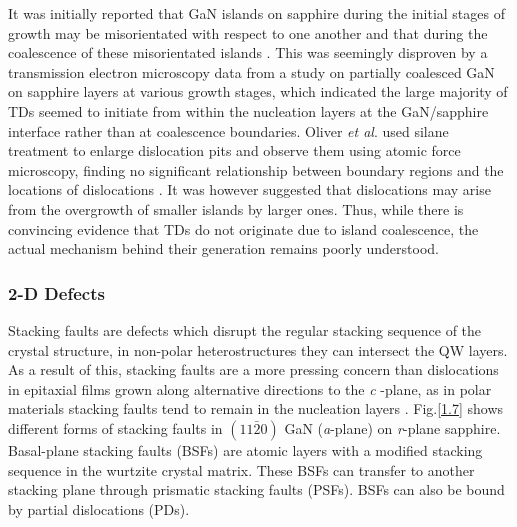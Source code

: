 It was initially reported that GaN islands on sapphire during the initial stages of growth may be misorientated with respect to one another and that during the coalescence of these misorientated islands \cite{Ning1996}. This was seemingly disproven by a transmission electron microscopy data from a study on partially coalesced GaN on sapphire layers at various growth stages, which indicated the large majority of TDs seemed to initiate from within the nucleation layers at the GaN/sapphire interface rather than at coalescence boundaries. Oliver {\it et al}. used silane treatment to enlarge dislocation pits and observe them using atomic force microscopy, finding no significant relationship between boundary regions and the locations of dislocations \cite{Oliver2008a}. It was however suggested that dislocations may arise from the overgrowth of smaller islands by larger ones. Thus, while there is convincing evidence that TDs do not originate due to island coalescence, the actual mechanism behind their generation remains poorly understood.

\subsubsection{2-D Defects}

Stacking faults are defects which disrupt the regular stacking sequence of the crystal structure, in non-polar heterostructures they can intersect the QW layers. As a result of this, stacking faults are a more pressing concern than dislocations in epitaxial films grown along alternative directions to the {\it c}
-plane, as in polar materials stacking faults tend to remain in the nucleation layers \cite{Scholz2012}. Fig.\ref{1.7} shows different forms of stacking faults in $(11\bar{2}0)$ GaN ({\it a}-plane) on {\it r}-plane sapphire.  Basal-plane stacking faults  (BSFs) are atomic layers with a modified stacking sequence in the wurtzite crystal matrix. These BSFs can transfer to another stacking plane through prismatic stacking faults  (PSFs). BSFs can also be bound by partial dislocations  (PDs).



